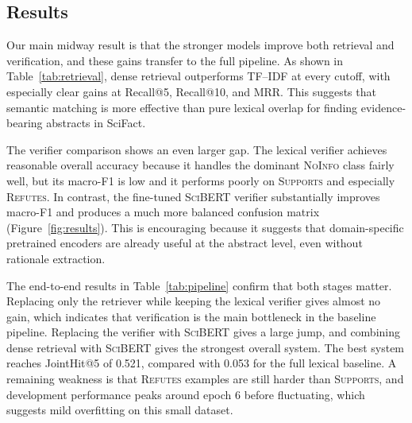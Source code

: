 \documentclass[11pt]{article}
\begin{document}
\begin{table}[t]
\centering
\small
{}
\caption{Oracle verification and end-to-end pipeline results. The TF--IDF + Logistic Regression line serves as the full lexical baseline.}
\label{tab:pipeline}
\end{table}

\subsection{Results}
Our main midway result is that the stronger models improve both retrieval and verification, and these gains transfer to the full pipeline. As shown in Table~\ref{tab:retrieval}, dense retrieval outperforms TF--IDF at every cutoff, with especially clear gains at Recall@5, Recall@10, and MRR. This suggests that semantic matching is more effective than pure lexical overlap for finding evidence-bearing abstracts in SciFact.

The verifier comparison shows an even larger gap. The lexical verifier achieves reasonable overall accuracy because it handles the dominant \textsc{NoInfo} class fairly well, but its macro-F1 is low and it performs poorly on \textsc{Supports} and especially \textsc{Refutes}. In contrast, the fine-tuned \textsc{SciBERT} verifier substantially improves macro-F1 and produces a much more balanced confusion matrix (Figure~\ref{fig:results}). This is encouraging because it suggests that domain-specific pretrained encoders are already useful at the abstract level, even without rationale extraction.

The end-to-end results in Table~\ref{tab:pipeline} confirm that both stages matter. Replacing only the retriever while keeping the lexical verifier gives almost no gain, which indicates that verification is the main bottleneck in the baseline pipeline. Replacing the verifier with \textsc{SciBERT} gives a large jump, and combining dense retrieval with \textsc{SciBERT} gives the strongest overall system. The best system reaches JointHit@5 of 0.521, compared with 0.053 for the full lexical baseline. A remaining weakness is that \textsc{Refutes} examples are still harder than \textsc{Supports}, and development performance peaks around epoch 6 before fluctuating, which suggests mild overfitting on this small dataset.
\end{document}
